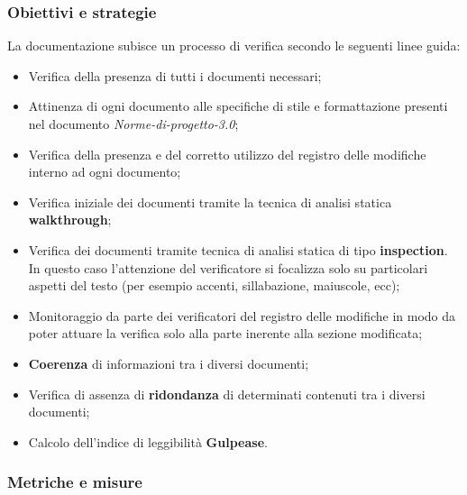 \documentclass[a4paper,11pt]{article}
\begin{document}
\subsubsection{Obiettivi e strategie}
La documentazione subisce un processo di verifica secondo le seguenti linee guida:  
\begin{itemize}
\item Verifica della presenza di tutti i documenti necessari;
\item Attinenza di ogni documento alle specifiche di stile e formattazione presenti nel documento \textit{Norme-di-progetto-3.0};
\item Verifica della presenza e del corretto utilizzo del registro delle modifiche interno ad ogni documento;
\item Verifica iniziale dei documenti tramite la tecnica di analisi statica \textbf{walkthrough};
\item Verifica dei documenti tramite tecnica di analisi statica di tipo \textbf{inspection}. In questo caso l'attenzione del verificatore si focalizza solo su particolari aspetti del testo (per esempio accenti, sillabazione, maiuscole, ecc);
\item Monitoraggio da parte dei verificatori del registro delle modifiche in modo da poter attuare la verifica solo alla parte inerente alla sezione modificata;
\item \textbf{Coerenza} di informazioni tra i diversi documenti;
\item Verifica di assenza di \textbf{ridondanza} di determinati contenuti tra i diversi documenti;
\item Calcolo dell'indice di leggibilità \textbf{Gulpease}.
\end{itemize}


\subsubsection{Metriche e misure}
\end{document}

